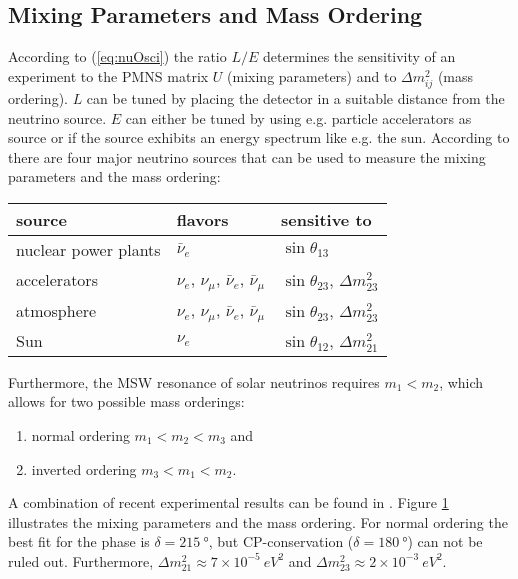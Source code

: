     \subsection{Mixing Parameters and Mass Ordering}
    \begin{figure}[t]
	    \label{fig:mixingParams}
    \end{figure}
    According to (\ref{eq:nuOsci}) the ratio $L/E$ determines the sensitivity of an experiment to the PMNS matrix $U$ (mixing parameters) and to $\Delta m^2_{ij}$ (mass ordering). $L$ can be tuned by placing the detector in a suitable distance from the neutrino source. $E$ can either be tuned by using e.g. particle accelerators as source or if the source exhibits an energy spectrum like e.g. the sun. According to \cite{zuber2011neutrino} there are four major neutrino sources that can be used to measure the mixing parameters and the mass ordering:
    \begin{center}
        \begin{tabular}{lll}
        \toprule
             source & flavors & sensitive to \\
             \hline
             nuclear power plants & $\bar{\nu}_e$ & $\sin\theta_{13}$ \\
             accelerators & $\nu_e$, $\nu_\mu$, $\bar{\nu}_e$, $\bar{\nu}_\mu$ & $\sin\theta_{23}$, $\Delta m^2_{23}$ \\
             atmosphere & $\nu_e$, $\nu_\mu$, $\bar{\nu}_e$, $\bar{\nu}_\mu$ & $\sin\theta_{23}$, $\Delta m^2_{23}$ \\
             Sun & $\nu_{e}$ & $\sin\theta_{12}$, $\Delta m^2_{21}$ \\
        \bottomrule
        \end{tabular}
    \end{center}
    Furthermore, the MSW resonance of solar neutrinos requires $m_1 < m_2$, which allows for two possible mass orderings:
    \begin{enumerate}
        \item normal ordering $m_1 < m_2 < m_3$ and
        \item inverted ordering $m_3 < m_1 < m_2$.
    \end{enumerate}
    A combination of recent experimental results can be found in \cite{Esteban2019}. Figure \ref{fig:mixingParams} illustrates the mixing parameters and the mass ordering. For normal ordering the best fit for the phase is $\delta=\SI{215}{\degree}$, but CP-conservation ($\delta=\SI{180}{\degree}$) can not be ruled out. Furthermore, $\Delta m^2_{21} \approx 7 \times 10^{-5} \SI{}{eV^2}$ and $\Delta m^2_{23} \approx 2 \times 10^{-3} \SI{}{eV^2}$.
    
